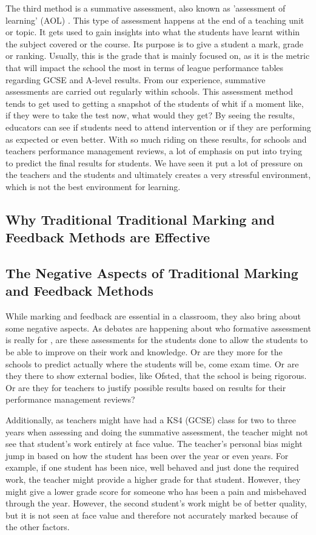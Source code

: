 	The third method is a summative assessment, also known as 'assessment of learning' (AOL) \cite{wellington2007secondary}. This type of assessment happens at the end of a teaching unit or topic. It gets used to gain insights into what the students have learnt within the subject covered or the course. Its purpose is to give a student a mark, grade or ranking. Usually, this is the grade that is mainly focused on, as it is the metric that will impact the school the most in terms of league performance tables regarding GCSE and A-level results. From our experience, summative assessments are carried out regularly within schools. This assessment method tends to get used to getting a snapshot of the students of whit if a moment like, if they were to take the test now, what would they get? By seeing the results, educators can see if students need to attend intervention or if they are performing as expected or even better. With so much riding on these results, for schools and teachers performance management reviews, a lot of emphasis on put into trying to predict the final results for students. We have seen it put a lot of pressure on the teachers and the students and ultimately creates a very stressful environment, which is not the best environment for learning.
	
	
	
	
	\subsection{Why Traditional Traditional Marking and Feedback Methods are Effective}
	
	
	\subsection{The Negative Aspects of Traditional Marking and Feedback Methods}
		
		While marking and feedback are essential in a classroom, they also bring about some negative aspects. As debates are happening about who formative assessment is really for \cite{wellington2007secondary}, are these assessments for the students done to allow the students to be able to improve on their work and knowledge. Or are they more for the schools to predict actually where the students will be, come exam time. Or are they there to show external bodies, like Ofsted, that the school is being rigorous. Or are they for teachers to justify possible results based on results for their performance management reviews?
		
		Additionally, as teachers might have had a KS4 (GCSE) class for two to three years when assessing and doing the summative assessment, the teacher might not see that student's work entirely at face value. The teacher's personal bias might jump in based on how the student has been over the year or even years. For example, if one student has been nice, well behaved and just done the required work, the teacher might provide a higher grade for that student. However, they might give a lower grade score for someone who has been a pain and misbehaved through the year. However, the second student's work might be of better quality, but it is not seen at face value and therefore not accurately marked because of the other factors.
		
